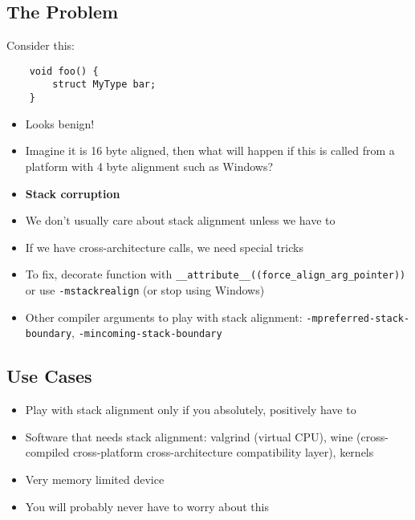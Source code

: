\documentclass{beamer}
\begin{document}
\subsection{The Problem}
\begin{frame}[fragile]{\insertsection}{\insertsubsection}
    Consider this:
    \begin{verbatim}
    void foo() {
        struct MyType bar;
    }
    \end{verbatim}
    \begin{itemize}
        \item Looks benign!\pause
        \item Imagine it is 16 byte aligned, then what will happen if this is called from a
            platform with 4 byte alignment such as Windows?\pause
        \item \textbf{Stack corruption}
    \end{itemize}
\end{frame}

\begin{frame}[fragile]{\insertsection}{\insertsubsection}
    \begin{itemize}
        \item We don't usually care about stack alignment unless we have to\pause
        \item If we have cross-architecture calls, we need special tricks\pause
        \item To fix, decorate function with \verb|__attribute__((force_align_arg_pointer))| or use
            \verb|-mstackrealign| \pause (or stop using Windows)
        \item Other compiler arguments to play with stack alignment:
            \verb|-mpreferred-stack-boundary|, \verb|-mincoming-stack-boundary|
    \end{itemize}
\end{frame}

\subsection{Use Cases}
\begin{frame}[fragile]{\insertsection}{\insertsubsection}
    \begin{itemize}
        \item Play with stack alignment only if you absolutely, positively have to\pause
        \item Software that needs stack alignment: valgrind (virtual CPU), wine (cross-compiled
            cross-platform cross-architecture compatibility layer), kernels\pause
        \item Very memory limited device\pause
        \item You will probably never have to worry about this
    \end{itemize}
\end{frame}
\end{document}
